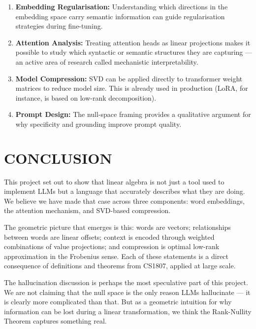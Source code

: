 \documentclass[12pt,a4paper]{article}
\begin{document}
\begin{enumerate}[label=\arabic*., itemsep=6pt]
    \item \textbf{Embedding Regularisation:} Understanding which directions in the embedding
          space carry semantic information can guide regularisation strategies during
          fine-tuning.

    \item \textbf{Attention Analysis:} Treating attention heads as linear projections makes
          it possible to study which syntactic or semantic structures they are capturing ---
          an active area of research called mechanistic interpretability.

    \item \textbf{Model Compression:} SVD can be applied directly to transformer weight
          matrices to reduce model size. This is already used in production (LoRA, for
          instance, is based on low-rank decomposition).

    \item \textbf{Prompt Design:} The null-space framing provides a qualitative argument
          for why specificity and grounding improve prompt quality.
\end{enumerate}

\section{CONCLUSION}

This project set out to show that linear algebra is not just a tool used to implement LLMs
but a language that accurately describes what they are doing. We believe we have made that
case across three components: word embeddings, the attention mechanism, and SVD-based
compression.

The geometric picture that emerges is this: words are vectors; relationships between words
are linear offsets; context is encoded through weighted combinations of value projections;
and compression is optimal low-rank approximation in the Frobenius sense. Each of these
statements is a direct consequence of definitions and theorems from CS1807, applied at
large scale.

The hallucination discussion is perhaps the most speculative part of this project. We are
not claiming that the null space is the only reason LLMs hallucinate --- it is clearly more
complicated than that. But as a geometric intuition for why information can be lost during
a linear transformation, we think the Rank-Nullity Theorem captures something real.
\end{document}
